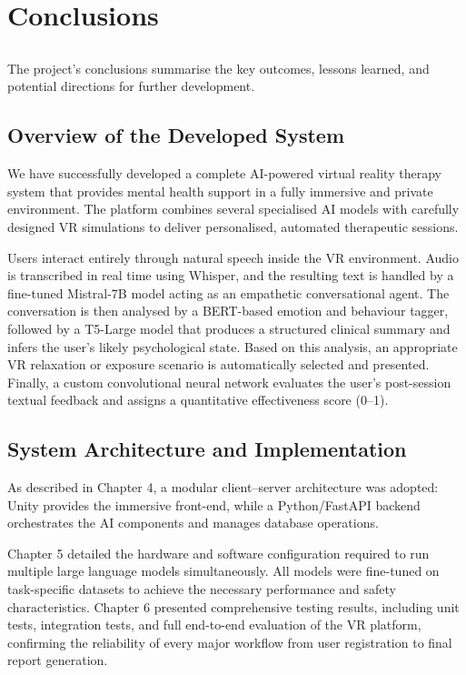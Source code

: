\chapter{Conclusions}
\label{chap:conclusions}


\section*{}
The project’s conclusions summarise the key outcomes, lessons learned, and potential directions for further development. 

\section{Overview of the Developed System}

We have successfully developed a complete AI-powered virtual reality therapy system that provides mental health support in a fully immersive and private environment. The platform combines several specialised AI models with carefully designed VR simulations to deliver personalised, automated therapeutic sessions.

Users interact entirely through natural speech inside the VR environment. Audio is transcribed in real time using Whisper, and the resulting text is handled by a fine-tuned Mistral-7B model acting as an empathetic conversational agent. The conversation is then analysed by a BERT-based emotion and behaviour tagger, followed by a T5-Large model that produces a structured clinical summary and infers the user’s likely psychological state. Based on this analysis, an appropriate VR relaxation or exposure scenario is automatically selected and presented. Finally, a custom convolutional neural network evaluates the user’s post-session textual feedback and assigns a quantitative effectiveness score (0–1).

\section{System Architecture and Implementation}

As described in Chapter 4, a modular client–server architecture was adopted: Unity provides the immersive front-end, while a Python/FastAPI backend orchestrates the AI components and manages database operations.

Chapter 5 detailed the hardware and software configuration required to run multiple large language models simultaneously. All models were fine-tuned on task-specific datasets to achieve the necessary performance and safety characteristics. Chapter 6 presented comprehensive testing results, including unit tests, integration tests, and full end-to-end evaluation of the VR platform, confirming the reliability of every major workflow from user registration to final report generation.

